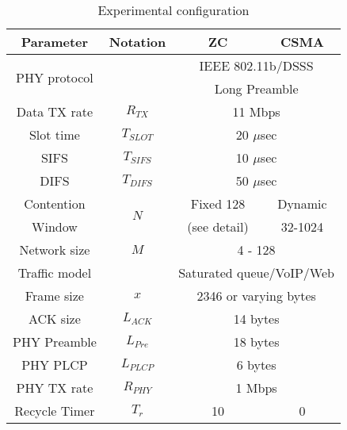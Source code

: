 \documentclass{acm_proc_article-sp}
\newcommand{\rt}{$T_{r}$\xspace}
\newcommand{\m}{$M$\xspace}
\begin{document}
\begin{table}[ht]
\small
    \centering \caption{Experimental configuration}
        \begin{tabular}{|c||c|c|c|}
\hline
        {\bf{Parameter}}&{\bf{Notation}}&{\bf{ZC}}   &{\bf{CSMA}}\\
        \hline
        \multirow{2}{*}{PHY protocol}& &\multicolumn{2}{|c|}{IEEE 802.11b/DSSS} \\
        &&\multicolumn{2}{|c|}{Long Preamble} \\
        \hline
        Data TX rate &$R_{TX}$&\multicolumn{2}{|c|}{11 Mbps}\\
        \hline
        Slot time    &$T_{SLOT}$&\multicolumn{2}{|c|}{20 $\mu{}$sec}\\
        \hline
        SIFS&$T_{SIFS}$&\multicolumn{2}{|c|}{10 $\mu{}$sec}\\
        \hline
        DIFS&$T_{DIFS}$&\multicolumn{2}{|c|}{50 $\mu{}$sec}\\
        \hline
        Contention&\multirow{2}{*}{$N$}&Fixed 128&Dynamic\\
        Window&& (see detail)& 32-1024\\
        \hline
        Network size&\m&\multicolumn{2}{|c|}{4 - 128}\\
        \hline
        Traffic model    &&\multicolumn{2}{|c|}{Saturated queue/VoIP/Web}\\
        \hline
        Frame size&$x$&\multicolumn{2}{|c|}{2346 or varying bytes}\\
        \hline
        ACK size&$L_{ACK}$&\multicolumn{2}{|c|}{14 bytes}\\
        \hline
        PHY Preamble&$L_{Pre}$ &\multicolumn{2}{|c|}{18 bytes}\\
        PHY PLCP&$L_{PLCP}$&\multicolumn{2}{|c|}{6 bytes}\\
        \hline
        PHY TX rate&$R_{PHY}$&\multicolumn{2}{|c|}{1 Mbps}\\
        \hline
        Recycle Timer    &\rt&10         &0\\
        \hline
\end{tabular}
      \label{table.expconfig}
\end{table}
\end{document}
